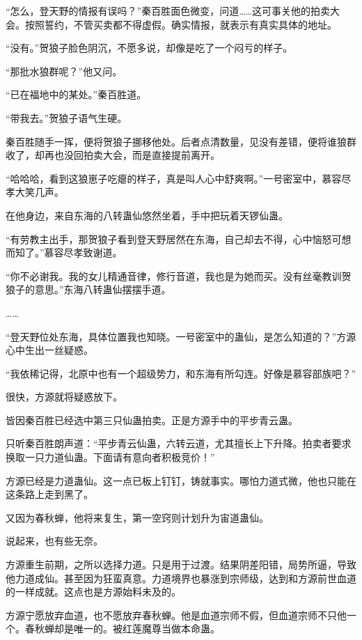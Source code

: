 
\begin{this_body}



“怎么，登天野的情报有误吗？”秦百胜面色微变，问道……这可事关他的拍卖大会。按照誓约，不管买卖都不得虚假。确实情报，就表示有真实具体的地址。

“没有。”贺狼子脸色阴沉，不愿多说，却像是吃了一个闷亏的样子。

“那批水狼群呢？”他又问。

“已在福地中的某处。”秦百胜道。

“带我去。”贺狼子语气生硬。

秦百胜随手一挥，便将贺狼子挪移他处。后者点清数量，见没有差错，便将谁狼群收了，却再也没回拍卖大会，而是直接提前离开。

“哈哈哈，看到这狼崽子吃瘪的样子，真是叫人心中舒爽啊。”一号密室中，慕容尽孝大笑几声。

在他身边，来自东海的八转蛊仙悠然坐着，手中把玩着天锣仙蛊。

“有劳教主出手，那贺狼子看到登天野居然在东海，自己却去不得，心中恼怒可想而知了。”慕容尽孝致谢道。

“你不必谢我。我的女儿精通音律，修行音道，我也是为她而买。没有丝毫教训贺狼子的意思。”东海八转蛊仙摆摆手道。

……

“登天野位处东海，具体位置我也知晓。一号密室中的蛊仙，是怎么知道的？”方源心中生出一丝疑惑。

“我依稀记得，北原中也有一个超级势力，和东海有所勾连。好像是慕容部族吧？”

很快，方源就将疑惑放下。

皆因秦百胜已经选中第三只仙蛊拍卖。正是方源手中的平步青云蛊。

只听秦百胜朗声道：“平步青云仙蛊，六转云道，尤其擅长上下升降。拍卖者要求换取一只力道仙蛊。下面请有意向者积极竞价！”

方源已经是力道蛊仙。这一点已板上钉钉，铸就事实。哪怕力道式微，他也只能在这条路上走到黑了。

又因为春秋蝉，他将来复生，第一空窍则计划升为宙道蛊仙。

说起来，也有些无奈。

方源重生前期，之所以选择力道。只是用于过渡。结果阴差阳错，局势所逼，导致他力道成仙。甚至因为狂蛮真意。力道境界也暴涨到宗师级，达到和方源前世血道的一样成就。这点也是方源始料未及的。

方源宁愿放弃血道，也不愿放弃春秋蝉。他是血道宗师不假，但血道宗师不只他一个。春秋蝉却是唯一的。被红莲魔尊当做本命蛊。


\end{this_body}
